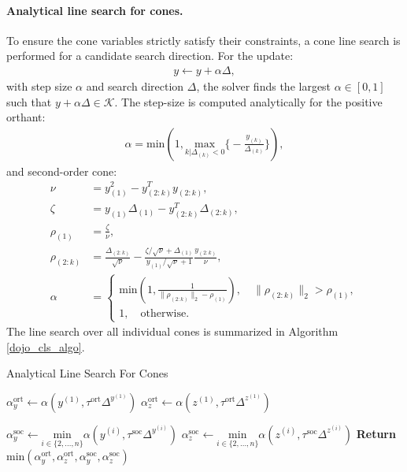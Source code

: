 \paragraph{Analytical line search for cones.}
To ensure the cone variables strictly satisfy their constraints, a cone line search is performed for a candidate search direction. For the update:
\begin{align}
	y \leftarrow y + \alpha \Delta,
\end{align}
with step size $\alpha$ and search direction $\Delta$, the solver finds the largest $\alpha \in [0, 1]$ such that $y + \alpha \Delta \in \mathcal{K}$. The step-size is computed analytically for the positive orthant:
\begin{align}
	\alpha = \mbox{min} \left(1,  \underset{k | \Delta_{(k)} < 0}{\mbox{max}} \Big \{ -\frac{y_{(k)}}{\Delta_{(k)}} \Big \} \right), 
	\label{dojo_alpha_ort}
\end{align}
and second-order cone:
\begin{align}
	\nu &= y_{(1)}^2 - y_{(2:k)}^T y_{(2:k)}, \\
	\zeta &= y_{(1)} \Delta_{(1)} - y_{(2:k)}^T \Delta_{(2:k)}, \\
	\rho_{(1)} &= \frac{\zeta}{\nu}, \\
	\rho_{(2:k)} &= \frac{\Delta_{(2:k)}}{\sqrt{\nu}} - \frac{\zeta / \sqrt{\nu} + \Delta_{(1)}}{y_{(1)} / \sqrt{\nu} + 1} \frac{y_{(2:k)}}{\nu}, \\
	\alpha &= \begin{cases}
		\mbox{min} \left( 1, \frac{1}{\|\rho_{(2:k)}\|_2 - \rho_{(1)}} \right), \quad \|\rho_{(2:k)}\|_2 > \rho_{(1)}, \\
		1, \quad \mbox{otherwise}.
	\end{cases}
	\label{dojo_alpha_soc}
\end{align}
The line search over all individual cones is summarized in Algorithm \ref{dojo_cls_algo}.

\begin{algorithm}[H]
	\caption{Analytical Line Search For Cones}\label{dojo_cls_algo}
	\begin{algorithmic}[1]
		\State $\alpha_y^{\mbox{ort}} \gets \alpha(y^{(1)}, \tau^{\mbox{ort}} \Delta^{y^{(1)}}) $ 
		\State $\alpha_z^{\mbox{ort}} \gets \alpha(z^{(1)}, \tau^{\mbox{ort}} \Delta^{z^{(1)}}) $ 
		
		\State $\alpha_y^{\mbox{soc}} \gets \underset{i \in \{2, \dots, n \}}{\mbox{min}} \alpha(y^{(i)}, \tau^{\mbox{soc}} \Delta^{y^{(i)}})$ 
		\State $\alpha_z^{\mbox{soc}} \gets \underset{i \in \{2, \dots, n \}}{\mbox{min}} \alpha(z^{(i)}, \tau^{\mbox{soc}} \Delta^{z^{(i)}})$ 
		\State \textbf{Return} $\mbox{min}(\alpha_y^{\mbox{ort}}, \alpha_z^{\mbox{ort}}, \alpha_y^{\mbox{soc}}, \alpha_z^{\mbox{soc}})$
		\EndProcedure
	\end{algorithmic}
\end{algorithm}

